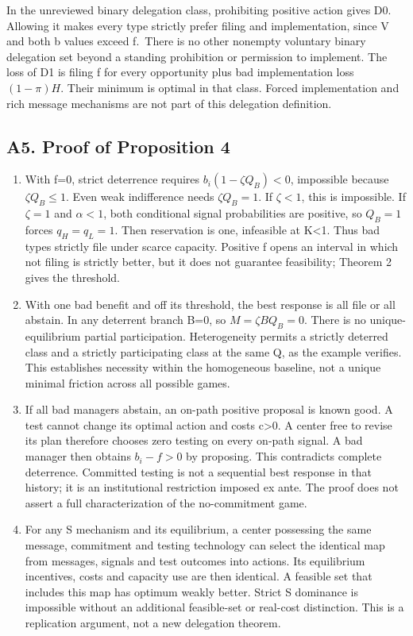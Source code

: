 \documentclass[
  11pt,
]{article}
\begin{document}
In the unreviewed binary delegation class, prohibiting positive action
gives D0. Allowing it makes every type strictly prefer filing and
implementation, since V and both b values exceed f.~There is no other
nonempty voluntary binary delegation set beyond a standing prohibition
or permission to implement. The loss of D1 is filing f for every
opportunity plus bad implementation loss \((1-\pi)H\). Their minimum is
optimal in that class. Forced implementation and rich message mechanisms
are not part of this delegation definition.

\subsection{A5. Proof of Proposition
4}\label{a5.-proof-of-proposition-4}

\begin{enumerate}
\def\labelenumi{(\alph{enumi})}
\item
  With f=0, strict deterrence requires \(b_i(1-\zeta Q_B)<0\),
  impossible because \(\zeta Q_B\leq1\). Even weak indifference needs
  \(\zeta Q_B=1\). If \(\zeta<1\), this is impossible. If \(\zeta=1\)
  and \(\alpha<1\), both conditional signal probabilities are positive,
  so \(Q_B=1\) forces \(q_H=q_L=1\). Then reservation is one, infeasible
  at K\textless1. Thus bad types strictly file under scarce capacity.
  Positive f opens an interval in which not filing is strictly better,
  but it does not guarantee feasibility; Theorem 2 gives the threshold.
\item
  With one bad benefit and off its threshold, the best response is all
  file or all abstain. In any deterrent branch B=0, so
  \(M=\zeta BQ_B=0\). There is no unique-equilibrium partial
  participation. Heterogeneity permits a strictly deterred class and a
  strictly participating class at the same Q, as the example verifies.
  This establishes necessity within the homogeneous baseline, not a
  unique minimal friction across all possible games.
\item
  If all bad managers abstain, an on-path positive proposal is known
  good. A test cannot change its optimal action and costs
  c\textgreater0. A center free to revise its plan therefore chooses
  zero testing on every on-path signal. A bad manager then obtains
  \(b_i-f>0\) by proposing. This contradicts complete deterrence.
  Committed testing is not a sequential best response in that history;
  it is an institutional restriction imposed ex ante. The proof does not
  assert a full characterization of the no-commitment game.
\item
  For any S mechanism and its equilibrium, a center possessing the same
  message, commitment and testing technology can select the identical
  map from messages, signals and test outcomes into actions. Its
  equilibrium incentives, costs and capacity use are then identical. A
  feasible set that includes this map has optimum weakly better. Strict
  S dominance is impossible without an additional feasible-set or
  real-cost distinction. This is a replication argument, not a new
  delegation theorem.
\end{enumerate}
\end{document}
